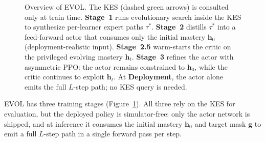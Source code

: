 \documentclass[sigconf,anonymous]{acmart}
\newcommand{\ours}{\textrm{EVOL}}
\begin{document}
\begin{figure}[htb!]
    \caption{Overview of \ours{}. The KES (dashed green arrows) is consulted only at train time. \textbf{Stage~1} runs evolutionary search inside the KES to synthesize per-learner expert paths $\tau^*$. \textbf{Stage~2} distills $\tau^*$ into a feed-forward actor that consumes only the initial mastery $\mathbf{h}_0$ (deployment-realistic input). \textbf{Stage~2.5} warm-starts the critic on the privileged evolving mastery $\mathbf{h}_t$. \textbf{Stage~3} refines the actor with asymmetric PPO: the actor remains constrained to $\mathbf{h}_0$, while the critic continues to exploit $\mathbf{h}_t$. At \textbf{Deployment}, the actor alone emits the full $L$-step path; no KES query is needed.}
    \label{fig:framework}
\end{figure}

\ours{} has three training stages (Figure~\ref{fig:framework}). All three rely on the KES for evaluation, but the deployed policy is simulator-free: only the actor network is shipped, and at inference it consumes the initial mastery $\mathbf{h}_0$ and target mask $\mathbf{g}$ to emit a full $L$-step path in a single forward pass per step.
\end{document}
